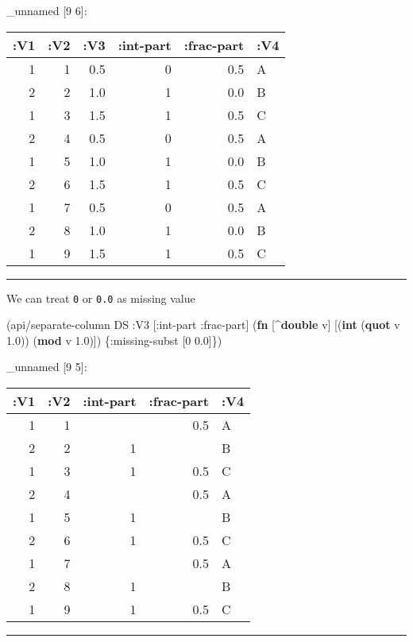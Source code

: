 \documentclass[]{article}
\newenvironment{Shaded}{\begin{snugshade}}{\end{snugshade}}
\newcommand{\KeywordTok}[1]{\textcolor[rgb]{0.13,0.29,0.53}{\textbf{#1}}}
\newcommand{\DecValTok}[1]{\textcolor[rgb]{0.00,0.00,0.81}{#1}}
\newcommand{\FloatTok}[1]{\textcolor[rgb]{0.00,0.00,0.81}{#1}}
\newcommand{\AttributeTok}[1]{\textcolor[rgb]{0.77,0.63,0.00}{#1}}
\newcommand{\NormalTok}[1]{#1}
\begin{document}
\_unnamed {[}9 6{]}:

\begin{longtable}[]{@{}rrrrrl@{}}
\toprule
:V1 & :V2 & :V3 & :int-part & :frac-part & :V4\tabularnewline
\midrule
\endhead
1 & 1 & 0.5 & 0 & 0.5 & A\tabularnewline
2 & 2 & 1.0 & 1 & 0.0 & B\tabularnewline
1 & 3 & 1.5 & 1 & 0.5 & C\tabularnewline
2 & 4 & 0.5 & 0 & 0.5 & A\tabularnewline
1 & 5 & 1.0 & 1 & 0.0 & B\tabularnewline
2 & 6 & 1.5 & 1 & 0.5 & C\tabularnewline
1 & 7 & 0.5 & 0 & 0.5 & A\tabularnewline
2 & 8 & 1.0 & 1 & 0.0 & B\tabularnewline
1 & 9 & 1.5 & 1 & 0.5 & C\tabularnewline
\bottomrule
\end{longtable}

\begin{center}\rule{0.5\linewidth}{0.5pt}\end{center}

We can treat \texttt{0} or \texttt{0.0} as missing value

\begin{Shaded}
\begin{Highlighting}[]
\NormalTok{(api/separate-column DS }\AttributeTok{:V3}\NormalTok{ [}\AttributeTok{:int-part} \AttributeTok{:frac-part}\NormalTok{] (}\KeywordTok{fn}\NormalTok{ [^}\KeywordTok{double}\NormalTok{ v]}
\NormalTok{                                                     [(}\KeywordTok{int}\NormalTok{ (}\KeywordTok{quot}\NormalTok{ v }\FloatTok{1.0}\NormalTok{))}
\NormalTok{                                                      (}\KeywordTok{mod}\NormalTok{ v }\FloatTok{1.0}\NormalTok{)]) \{}\AttributeTok{:missing-subst}\NormalTok{ [}\DecValTok{0} \FloatTok{0.0}\NormalTok{]\})}
\end{Highlighting}
\end{Shaded}

\_unnamed {[}9 5{]}:

\begin{longtable}[]{@{}rrrrl@{}}
\toprule
:V1 & :V2 & :int-part & :frac-part & :V4\tabularnewline
\midrule
\endhead
1 & 1 & & 0.5 & A\tabularnewline
2 & 2 & 1 & & B\tabularnewline
1 & 3 & 1 & 0.5 & C\tabularnewline
2 & 4 & & 0.5 & A\tabularnewline
1 & 5 & 1 & & B\tabularnewline
2 & 6 & 1 & 0.5 & C\tabularnewline
1 & 7 & & 0.5 & A\tabularnewline
2 & 8 & 1 & & B\tabularnewline
1 & 9 & 1 & 0.5 & C\tabularnewline
\bottomrule
\end{longtable}

\begin{center}\rule{0.5\linewidth}{0.5pt}\end{center}
\end{document}
